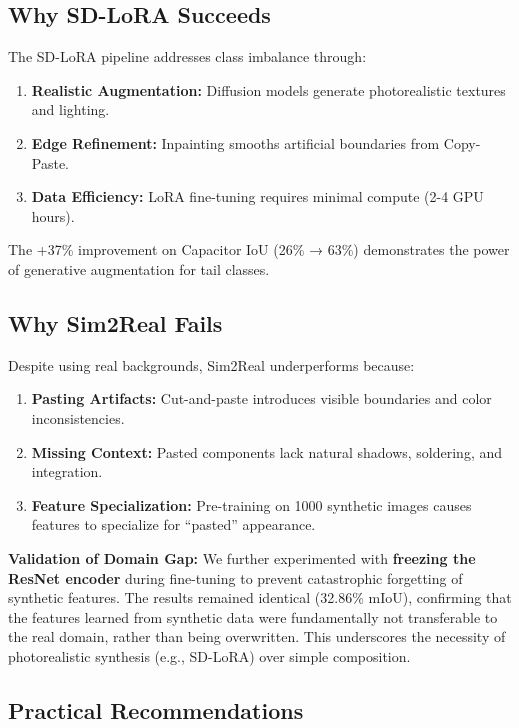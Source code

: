 \documentclass[12pt,a4paper]{article}
\begin{document}
\subsection{Why SD-LoRA Succeeds}

The SD-LoRA pipeline addresses class imbalance through:
\begin{enumerate}
    \item \textbf{Realistic Augmentation:} Diffusion models generate photorealistic textures and lighting.
    \item \textbf{Edge Refinement:} Inpainting smooths artificial boundaries from Copy-Paste.
    \item \textbf{Data Efficiency:} LoRA fine-tuning requires minimal compute (2-4 GPU hours).
\end{enumerate}

The +37\% improvement on Capacitor IoU (26\% → 63\%) demonstrates the power of generative augmentation for tail classes.

\subsection{Why Sim2Real Fails}

Despite using real backgrounds, Sim2Real underperforms because:
\begin{enumerate}
    \item \textbf{Pasting Artifacts:} Cut-and-paste introduces visible boundaries and color inconsistencies.
    \item \textbf{Missing Context:} Pasted components lack natural shadows, soldering, and integration.
    \item \textbf{Feature Specialization:} Pre-training on 1000 synthetic images causes features to specialize for ``pasted'' appearance.
\end{enumerate}

\textbf{Validation of Domain Gap:} We further experimented with \textbf{freezing the ResNet encoder} during fine-tuning to prevent catastrophic forgetting of synthetic features. The results remained identical (32.86\% mIoU), confirming that the features learned from synthetic data were fundamentally not transferable to the real domain, rather than being overwritten. This underscores the necessity of photorealistic synthesis (e.g., SD-LoRA) over simple composition.

\subsection{Practical Recommendations}
\end{document}
